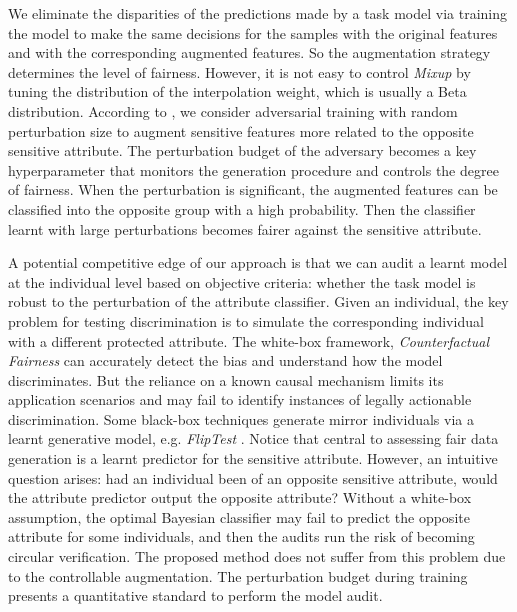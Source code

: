 \documentclass[letterpaper]{article} %
\begin{document}
  We eliminate the disparities of the predictions made by a task model via training the model to make the same decisions for the samples with the original features and with the corresponding augmented features.
So the augmentation strategy determines the level of fairness. 
However, it is not easy to control {\it Mixup} by tuning the distribution of the interpolation weight, which is usually a Beta distribution.  
According to \citet{zhang2021does}, 
we consider adversarial training with random perturbation size to augment sensitive features more related to the opposite sensitive attribute.
The perturbation budget of the adversary becomes a key hyperparameter that monitors the generation procedure and controls the degree of fairness.
When the perturbation is significant, the augmented features can be classified into the opposite group with a high probability. 
Then the classifier learnt with large perturbations becomes fairer against the sensitive attribute.

A potential competitive edge of our approach is that we can audit a learnt model at the individual level based on objective criteria: whether the task model is robust to the perturbation of the attribute classifier.
Given an individual, the key problem for testing discrimination is to simulate the corresponding individual with a different protected attribute.
The white-box framework, {\it Counterfactual Fairness} \cite{kusner2017counterfactual} can accurately detect the bias and understand how the model discriminates.
But the reliance on a known causal mechanism limits its application scenarios and may fail to identify instances of legally actionable discrimination.
Some black-box techniques generate mirror individuals via a learnt generative model, e.g. {\it FlipTest} \cite{black2020fliptest}.
Notice that central to assessing fair data generation is a learnt predictor for the sensitive attribute.
However, an intuitive question arises: had an individual been of an opposite sensitive attribute, would the attribute predictor output the opposite attribute?
Without a white-box assumption, the optimal Bayesian classifier may fail to predict the opposite attribute for some individuals, and then the audits run the risk of becoming circular verification. 
The proposed method does not suffer from this problem due to the controllable augmentation.
The perturbation budget during training presents a quantitative standard to perform the model audit. 
\end{document}
